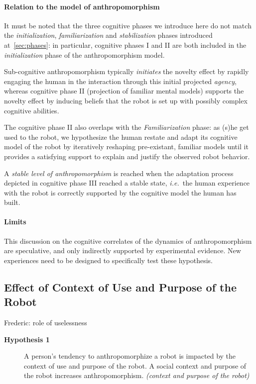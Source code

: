 \documentclass[twocolumn]{svjour3}          %
\newcommand{\ie}{{\textit{i.e.~}}}
\begin{document}
\paragraph{Relation to the model of anthropomorphism} It must be noted that the
three cognitive phases we introduce here do not match the
\emph{initialization}, \emph{familiarization} and \emph{stabilization} phases
introduced at~\ref{sec:phases}: in particular, cognitive phases I and II are
both included in the \emph{initialization} phase of the anthropomorphism model.

Sub-cognitive anthropomorphism typically \emph{initiates} the novelty effect by
rapidly engaging the human in the interaction through this initial projected
\emph{agency}, whereas cognitive phase II (projection of familiar mental
models) supports the novelty effect by inducing beliefs that the robot is set
up with possibly complex cognitive abilities.

The cognitive phase II also overlaps with the \emph{Familiarization} phase: as
(s)he get used to the robot, we hypothesize the human restate and adapt its
cognitive model of the robot by iteratively reshaping pre-existant, familiar
models until it provides a satisfying support to explain and justify the
observed robot behavior.

A \emph{stable level of anthropomorphism} is reached when the adaptation
process depicted in cognitive phase III reached a stable state, \ie the human
experience with the robot is correctly supported by the cognitive model the
human has built.

\paragraph{Limits} This discussion on the cognitive correlates of the dynamics
of anthropomorphism are speculative, and only indirectly supported by
experimental evidence. New experiences need to be designed to specifically test
these hypothesis.

\subsection{Effect of Context of Use and Purpose of the Robot}
\label{sec:8.1}
Frederic: role of uselessness


\begin{description}
	\item[\textbf{Hypothesis 1}] A person's tendency to anthropomorphize a robot is impacted by the context of use and purpose of the robot. A social context and purpose of the robot increases anthropomorphism. \textit{(context and purpose of the robot)}
\end{description}
\end{document}
